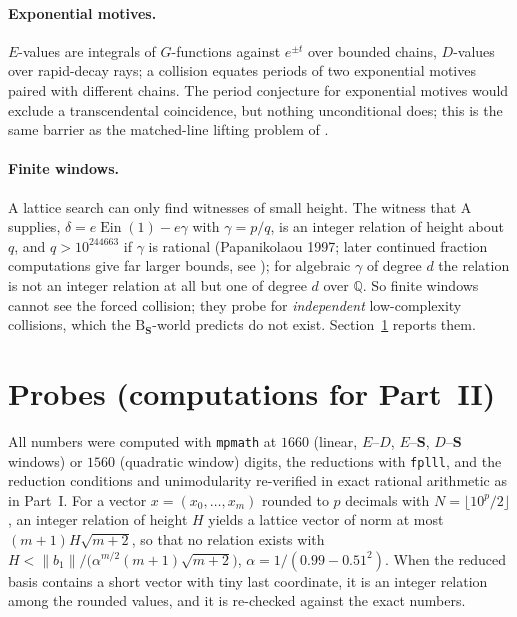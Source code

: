 \documentclass[11pt,a4paper]{article}
\newcommand{\Q}{\mathbb Q}
\newcommand{\Ein}{\operatorname{Ein}}
\newcommand{\Sring}{\mathbf S}
\theoremstyle{definition}
\theoremstyle{remark}
\numberwithin{equation}{section}
\begin{document}
\paragraph{Exponential motives.}
$E$-values are integrals of $G$-functions against $e^{\pm t}$ over bounded chains, $D$-values
over rapid-decay rays; a collision equates periods of two exponential motives paired with
different chains. The period conjecture for exponential motives \cite{FJ} would exclude a
transcendental coincidence, but nothing unconditional does; this is the same barrier as the
matched-line lifting problem of \cite{K002}.

\paragraph{Finite windows.}
A lattice search can only find witnesses of small height. The witness that $\mathrm A$
supplies, $\delta=e\Ein(1)-e\gamma$ with $\gamma=p/q$, is an integer relation of height
about $q$, and $q>10^{244663}$ if $\gamma$ is rational (Papanikolaou 1997; later continued
fraction computations give far larger bounds, see \cite{Lagarias}); for algebraic $\gamma$
of degree $d$ the relation is not an integer relation at all but one of degree $d$ over
$\Q$. So finite windows cannot see the forced collision; they probe for \emph{independent}
low-complexity collisions, which the $\mathrm B_{\Sring}$-world predicts do not exist.
Section~\ref{II:sec:probes} reports them.

\section{Probes (computations for Part~II)}\label{II:sec:probes}

All numbers were computed with \texttt{mpmath} at $1660$ (linear, $E$--$D$, $E$--$\Sring$,
$D$--$\Sring$ windows) or $1560$ (quadratic window) digits, the reductions with
\texttt{fplll}, and the reduction conditions and unimodularity re-verified in exact
rational arithmetic as in Part~I. For a vector $x=(x_0,\dots,x_m)$ rounded to $p$ decimals
with $N=\lfloor10^p/2\rfloor$, an integer relation of height $H$ yields a lattice vector of
norm at most $(m+1)H\sqrt{m+2}$, so that no relation exists with
$H<\|b_1\|/\bigl(\alpha^{m/2}(m+1)\sqrt{m+2}\bigr)$, $\alpha=1/(0.99-0.51^2)$. When the
reduced basis contains a short vector with tiny last coordinate, it is an integer relation
among the rounded values, and it is re-checked against the exact numbers.
\end{document}
